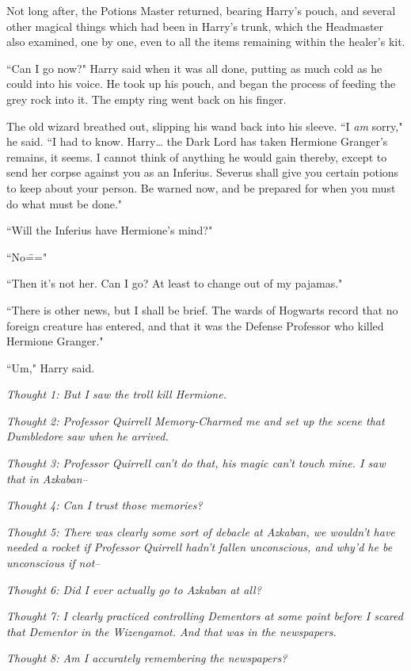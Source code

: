 Not long after, the Potions Master returned, bearing Harry's pouch, and several other magical things which had been in Harry's trunk, which the Headmaster also examined, one by one, even to all the items remaining within the healer's kit.

``Can I go now?" Harry said when it was all done, putting as much cold as he could into his voice. He took up his pouch, and began the process of feeding the grey rock into it. The empty ring went back on his finger.

The old wizard breathed out, slipping his wand back into his sleeve. ``I \emph{am} sorry," he said. ``I had to know. Harry{\ldots} the Dark Lord has taken Hermione Granger's remains, it seems. I cannot think of anything he would gain thereby, except to send her corpse against you as an Inferius. Severus shall give you certain potions to keep about your person. Be warned now, and be prepared for when you must do what must be done."

``Will the Inferius have Hermione's mind?"

``No\==="

``Then it's not her. Can I go? At least to change out of my pajamas."

``There is other news, but I shall be brief. The wards of Hogwarts record that no foreign creature has entered, and that it was the Defense Professor who killed Hermione Granger."

``Um," Harry said.

\emph{Thought 1: But I saw the troll kill Hermione.}

\emph{Thought 2: Professor Quirrell Memory-Charmed me and set up the scene that Dumbledore saw when he arrived.}

\emph{Thought 3: Professor Quirrell can't do that, his magic can't touch mine. I saw that in Azkaban\---}

\emph{Thought 4: Can I trust those memories?}

\emph{Thought 5: There was clearly some sort of debacle at Azkaban, we wouldn't have needed a rocket if Professor Quirrell hadn't fallen unconscious, and why'd he be unconscious if not\---}

\emph{Thought 6: Did I ever actually go to Azkaban at all?}

\emph{Thought 7: I clearly practiced controlling Dementors at some point before I scared that Dementor in the Wizengamot. And \emph{that} was in the newspapers.}

\emph{Thought 8: Am I accurately remembering the newspapers?}

